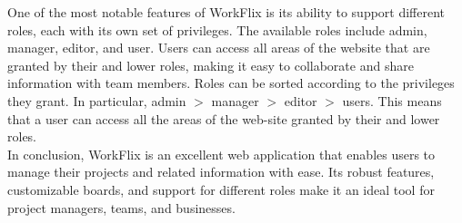 One of the most notable features of WorkFlix is its ability to support different roles, each with its own set of privileges. The available roles include admin, manager, editor, and user. Users can access all areas of the website that are granted by their and lower roles, making it easy to collaborate and share information with team members. Roles can be sorted according to the privileges they grant. In particular, admin $>$ manager $>$ editor $>$ users. This means that a user can access all the areas of the web-site granted by their and lower roles.\\


In conclusion, WorkFlix is an excellent web application that enables users to manage their projects and related information with ease. Its robust features, customizable boards, and support for different roles make it an ideal tool for project managers, teams, and businesses.\\